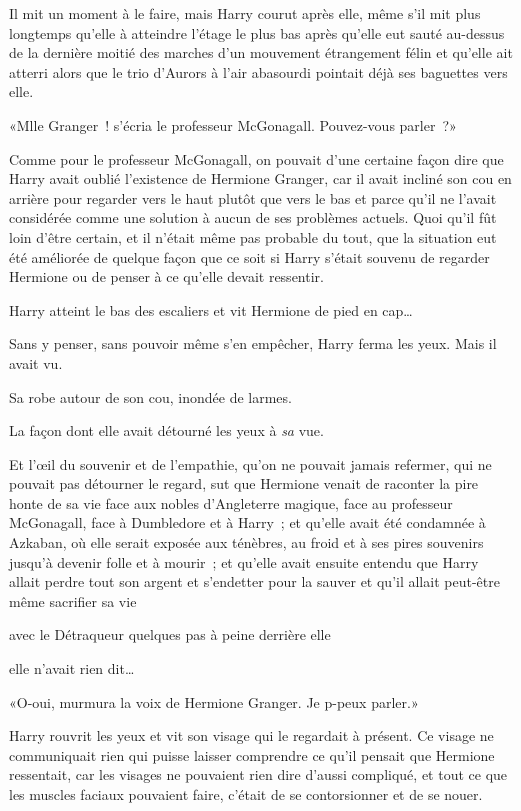 Il mit un moment à le faire, mais Harry courut après elle, même s'il mit plus longtemps qu'elle à atteindre l'étage le plus bas après qu'elle eut sauté au-dessus de la dernière moitié des marches d'un mouvement étrangement félin et qu'elle ait atterri alors que le trio d'Aurors à l'air abasourdi pointait déjà ses baguettes vers elle.

«Mlle Granger~! s'écria le professeur McGonagall. Pouvez-vous parler~?»

Comme pour le professeur McGonagall, on pouvait d'une certaine façon dire que Harry avait oublié l'existence de Hermione Granger, car il avait incliné son cou en arrière pour regarder vers le haut plutôt que vers le bas et parce qu'il ne l'avait considérée comme une solution à aucun de ses problèmes actuels. Quoi qu'il fût loin d'être certain, et il n'était même pas probable du tout, que la situation eut été améliorée de quelque façon que ce soit si Harry s'était souvenu de regarder Hermione ou de penser à ce qu'elle devait ressentir.

Harry atteint le bas des escaliers et vit Hermione de pied en cap…

Sans y penser, sans pouvoir même s'en empêcher, Harry ferma les yeux. Mais il avait vu.

Sa robe autour de son cou, inondée de larmes.

La façon dont elle avait détourné les yeux à \emph{sa} vue.

Et l'œil du souvenir et de l'empathie, qu'on ne pouvait jamais refermer, qui ne pouvait pas détourner le regard, sut que Hermione venait de raconter la pire honte de sa vie face aux nobles d'Angleterre magique, face au professeur McGonagall, face à Dumbledore et à Harry~; et qu'elle avait été condamnée à Azkaban, où elle serait exposée aux ténèbres, au froid et à ses pires souvenirs jusqu'à devenir folle et à mourir~; et qu'elle avait ensuite entendu que Harry allait perdre tout son argent et s'endetter pour la sauver et qu'il allait peut-être même sacrifier sa vie

avec le Détraqueur quelques pas à peine derrière elle

elle n'avait rien dit…

«O-oui, murmura la voix de Hermione Granger. Je p-peux parler.»

Harry rouvrit les yeux et vit son visage qui le regardait à présent. Ce visage ne communiquait rien qui puisse laisser comprendre ce qu'il pensait que Hermione ressentait, car les visages ne pouvaient rien dire d'aussi compliqué, et tout ce que les muscles faciaux pouvaient faire, c'était de se contorsionner et de se nouer.

